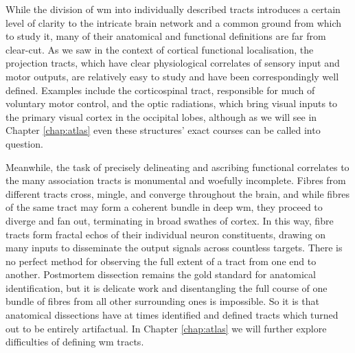 While the division of \gls{wm} into individually described tracts introduces a certain level of clarity to the intricate brain network and a common ground from which to study it, many of their anatomical and functional definitions are far from clear-cut.
As we saw in the context of cortical functional localisation, the projection tracts, which have clear physiological correlates of sensory input and motor outputs, are relatively easy to study and have been correspondingly well defined.
Examples include the corticospinal tract, responsible for much of voluntary motor control, and the optic radiations, which bring visual inputs to the primary visual cortex in the occipital lobes, although as we will see in Chapter \ref{chap:atlas} even these structures' exact courses can be called into question.

Meanwhile, the task of precisely delineating and ascribing functional correlates to the many association tracts is monumental and woefully incomplete.
Fibres from different tracts cross, mingle, and converge throughout the brain, and while fibres of the same tract may form a coherent bundle in deep \gls{wm}, they proceed to diverge and fan out, terminating in broad swathes of cortex.
In this way, fibre tracts form fractal echos of their individual neuron constituents, drawing on many inputs to disseminate the output signals across countless targets.
There is no perfect method for observing the full extent of a tract from one end to another.
Postmortem dissection remains the gold standard for anatomical identification, but it is delicate work and disentangling the full course of one bundle of fibres from all other surrounding ones is impossible.
So it is that anatomical dissections have at times identified and defined tracts which turned out to be entirely artifactual.
In Chapter \ref{chap:atlas} we will further explore difficulties of defining \gls{wm} tracts.

